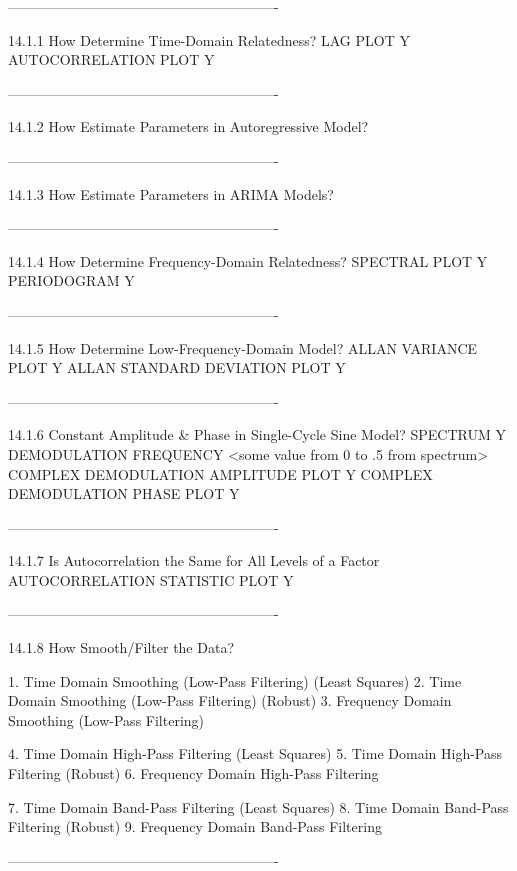 ----------------------------------------------------------
 
14.1.1
How Determine Time-Domain Relatedness?
      LAG PLOT Y
      AUTOCORRELATION PLOT Y
 
----------------------------------------------------------
 
14.1.2
How Estimate Parameters in Autoregressive Model?
 
----------------------------------------------------------
 
14.1.3
How Estimate Parameters in ARIMA Models?
 
----------------------------------------------------------
 
14.1.4
How Determine Frequency-Domain Relatedness?
      SPECTRAL PLOT Y
      PERIODOGRAM Y
 
----------------------------------------------------------
 
14.1.5
How Determine Low-Frequency-Domain Model?
      ALLAN VARIANCE PLOT Y
      ALLAN STANDARD DEVIATION PLOT Y
 
----------------------------------------------------------
 
14.1.6
Constant Amplitude & Phase in Single-Cycle Sine Model?
      SPECTRUM Y
      DEMODULATION FREQUENCY <some value from 0 to .5 from spectrum>
      COMPLEX DEMODULATION AMPLITUDE PLOT Y
      COMPLEX DEMODULATION PHASE PLOT Y
 
----------------------------------------------------------
 
14.1.7
Is Autocorrelation the Same for All Levels of a Factor
      AUTOCORRELATION STATISTIC PLOT Y
 
----------------------------------------------------------
 
14.1.8
How Smooth/Filter the Data?
 
   1. Time Domain Smoothing (Low-Pass Filtering) (Least Squares)
   2. Time Domain Smoothing (Low-Pass Filtering) (Robust)
   3. Frequency Domain Smoothing (Low-Pass Filtering)
 
   4. Time Domain High-Pass Filtering (Least Squares)
   5. Time Domain High-Pass Filtering (Robust)
   6. Frequency Domain High-Pass Filtering
 
   7. Time Domain Band-Pass Filtering (Least Squares)
   8. Time Domain Band-Pass Filtering (Robust)
   9. Frequency Domain Band-Pass Filtering
 
----------------------------------------------------------
 
